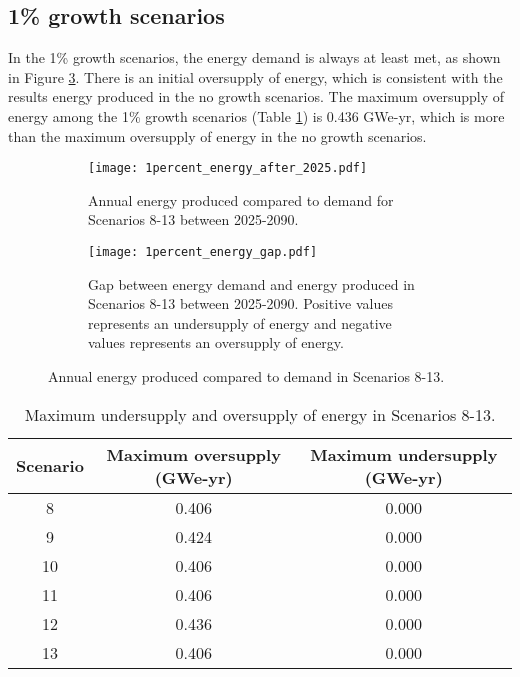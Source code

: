 \subsection{1\% growth scenarios}
In the 1\% growth scenarios, the energy demand is always at least 
met, as shown in Figure \ref{fig:1percent_energy}. There is an 
initial oversupply of energy, which is consistent with the 
results energy produced in the no growth scenarios. The 
maximum oversupply of energy among the 1\% growth scenarios 
(Table \ref{tab:1percent_energy}) is 0.436 GWe-yr, which is more 
than the maximum oversupply of energy in the no growth 
scenarios. 

\begin{figure}[h!]
    \centering
    \begin{subfigure}[b]{0.45\textwidth}
        \centering
        \texttt{[image: 1percent\_energy\_after\_2025.pdf]}
        \caption{Annual energy produced compared to demand for Scenarios 8-13
        between 2025-2090.}
        \label{fig:1percent_energy_after_2025}
    \end{subfigure}
    \hfill
    \begin{subfigure}[b]{0.45\textwidth}
        \centering
        \texttt{[image: 1percent\_energy\_gap.pdf]}
        \caption{Gap between energy demand and energy produced in Scenarios 8-13
        between 2025-2090. Positive values represents an undersupply of energy 
        and negative values represents an oversupply of energy. }
        \label{fig:1percent_energy_gap}
    \end{subfigure}
       \caption{Annual energy produced compared to demand in Scenarios 8-13.}
       \label{fig:1percent_energy}
\end{figure}

\begin{table}[h!]
    \centering
    \caption{Maximum undersupply and oversupply of energy in Scenarios 8-13.}
    \label{tab:1percent_energy}
    \begin{tabular}{c c c}
        \hline 
        Scenario & Maximum oversupply (GWe-yr) & Maximum undersupply (GWe-yr) \\
        \hline 
        8 & 0.406 & 0.000 \\
        9 & 0.424 & 0.000 \\
        10 & 0.406 & 0.000 \\
        11 & 0.406 & 0.000 \\
        12 & 0.436 & 0.000 \\
        13 & 0.406 & 0.000 \\
        \hline
    \end{tabular}
\end{table}


